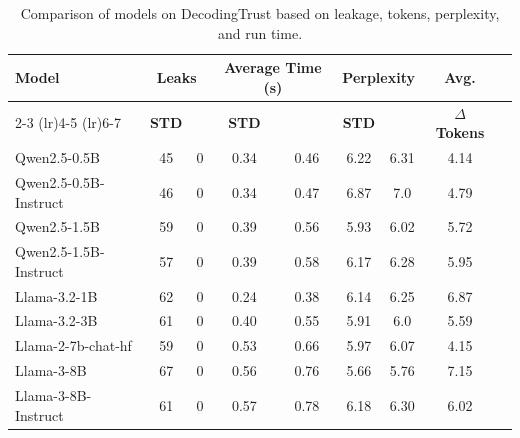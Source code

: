 \begin{table}[htbp]
    \scriptsize
    \centering
        \caption{Comparison of models on DecodingTrust based on leakage, tokens, perplexity, and run time.}
    \label{tab:model_comparison_1}

    \begin{tabular}{lcccccccr}
        \toprule
        \multirow{2}{*}{\textbf{Model}} & \multicolumn{2}{c}{\textbf{Leaks}} & \multicolumn{2}{c}{\textbf{Average Time (s)}} &  \multicolumn{2}{c}{\textbf{Perplexity}} & \multirow{2}{*}{\textbf{Avg.}} \\
        \cmidrule(lr){2-3} \cmidrule(lr){4-5}  \cmidrule(lr){6-7}
        & \textbf{STD} & \textbf{\Tool{}} & \textbf{STD} & \textbf{\Tool{}} & \textbf{STD} & \textbf{\Tool{}} & \textbf{$\Delta$ Tokens} \\
        \midrule
        Qwen2.5-0.5B & 45 & 0 & 0.34 & 0.46 & 6.22 & 6.31 & 4.14 \\

        Qwen2.5-0.5B-Instruct & 46 & 0 & 0.34 & 0.47 & 6.87 & 7.0 & 4.79 \\
        Qwen2.5-1.5B & 59 & 0 & 0.39 & 0.56 & 5.93 & 6.02 & 5.72 \\

        Qwen2.5-1.5B-Instruct & 57 & 0 & 0.39 & 0.58 & 6.17 & 6.28 & 5.95 \\
        Llama-3.2-1B & 62 & 0 & 0.24 & 0.38 & 6.14 & 6.25 & 6.87\\
        Llama-3.2-3B & 61 & 0 & 0.40 & 0.55 & 5.91 & 6.0 & 5.59 \\
        Llama-2-7b-chat-hf & 59 & 0 & 0.53 & 0.66 & 5.97 & 6.07 & 4.15 \\
        Llama-3-8B & 67 & 0 & 0.56 & 0.76 & 5.66 & 5.76 & 7.15 \\
        Llama-3-8B-Instruct & 61 & 0 & 0.57 & 0.78 & 6.18 & 6.30 & 6.02 \\
        \bottomrule
    \end{tabular}
\end{table}